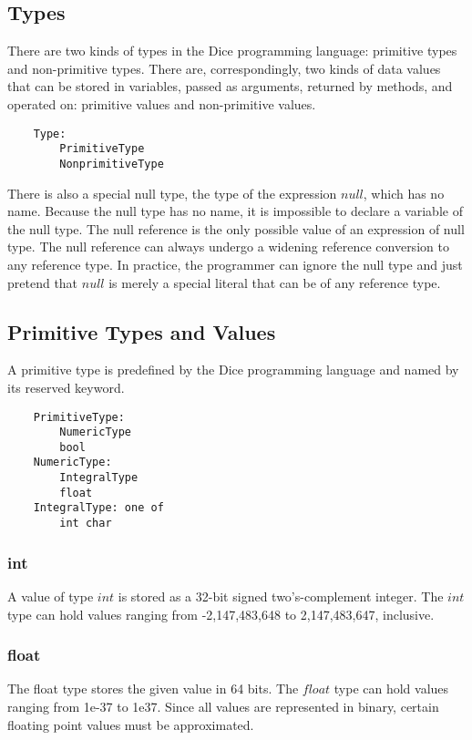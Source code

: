 \begin{homeworkProblem}
	\chapter{Types}
    There are two kinds of types in the Dice programming language: primitive types and non-primitive types.  There are, correspondingly, two kinds of data values that can be stored in variables, passed as arguments, returned by methods, and operated on: primitive values and non-primitive values.\\
	\begin{verbatim}
    Type:
        PrimitiveType
        NonprimitiveType
    \end{verbatim}
    There is also a special null type, the type of the expression $null$, which has no name. Because the null type has no name, it is impossible to declare a variable of the null type. The null reference is the only possible value of an expression of null type. The null reference can always undergo a widening reference conversion to any reference type. In practice, the programmer can ignore the null type and just pretend that $null$ is merely a special literal that can be of any reference type.\\

	\section{Primitive Types and Values}
    A primitive type is predefined by the Dice programming language and named by its reserved keyword.
    \begin{verbatim}
    PrimitiveType:
        NumericType
        bool
    NumericType:
        IntegralType
        float
    IntegralType: one of
        int char
    \end{verbatim}
    
    \subsection{int}
	A value of type $int$ is stored as a 32-bit signed two's-complement integer. The $int$ type can hold values ranging from -2,147,483,648 to 2,147,483,647, inclusive.

	\subsection{float}

	The float type stores the given value in 64 bits. The $float$ type can hold values ranging from 1e-37 to 1e37. Since all values are represented in binary, certain floating point values must be approximated.


\end{homeworkProblem}
